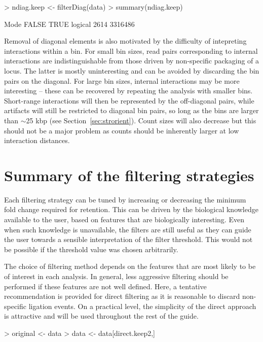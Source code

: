 \documentclass[12pt]{report}
\renewenvironment{Schunk}{\vspace{0pt}}{\vspace{0pt}}
\begin{document}
\begin{Schunk}
\begin{Sinput}
> ndiag.keep <- filterDiag(data)
> summary(ndiag.keep)
\end{Sinput}
\begin{Soutput}
   Mode   FALSE    TRUE 
logical    2614 3316486 
\end{Soutput}
\end{Schunk}

Removal of diagonal elements is also motivated by the difficulty of intepreting interactions within a bin.
For small bin sizes, read pairs corresponding to internal interactions are indistinguishable from those driven by non-specific packaging of a locus.
The latter is mostly uninteresting and can be avoided by discarding the bin pairs on the diagonal.
For large bin sizes, internal interactions may be more interesting -- these can be recovered by repeating the analysis with smaller bins.
Short-range interactions will then be represented by the off-diagonal pairs, while artifacts will still be restricted to diagonal bin pairs, so long as the bins are larger than $\sim$25 kbp (see Section~\ref{sec:strorient}).
Count sizes will also decrease but this should not be a major problem as counts should be inherently larger at low interaction distances. 

\section{Summary of the filtering strategies}
Each filtering strategy can be tuned by increasing or decreasing the minimum fold change required for retention.
This can be driven by the biological knowledge available to the user, based on features that are biologically interesting.
Even when such knowledge is unavailable, the filters are still useful as they can guide the user towards a sensible interpretation of the filter threshold.
This would not be possible if the threshold value was chosen arbitrarily.

The choice of filtering method depends on the features that are most likely to be of interest in each analysis.
In general, less aggressive filtering should be performed if these features are not well defined.
Here, a tentative recommendation is provided for direct filtering as it is reasonable to discard non-specific ligation events.
On a practical level, the simplicity of the direct approach is attractive and will be used throughout the rest of the guide.

\begin{Schunk}
\begin{Sinput}
> original <- data
> data <- data[direct.keep2,] 
\end{Sinput}
\end{Schunk}
\end{document}
